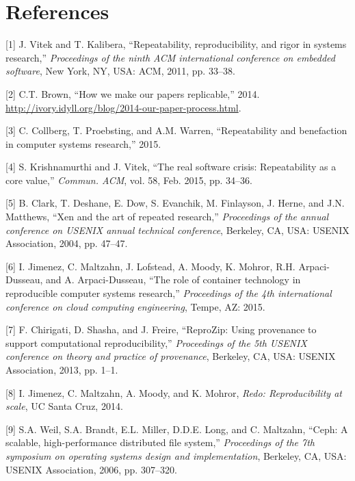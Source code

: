 \documentclass[10pt,reprint]{sigplanconf}
\begin{document}
\section{References}\label{references}

\noindent
\vspace{-2em} \setlength{\parindent}{-0.26in}
\setlength{\leftskip}{0.2in} \setlength{\parskip}{8pt}

{[}1{]} J. Vitek and T. Kalibera, ``Repeatability, reproducibility, and
rigor in systems research,'' \emph{Proceedings of the ninth ACM
international conference on embedded software}, New York, NY, USA: ACM,
2011, pp. 33--38.

{[}2{]} C.T. Brown, ``How we make our papers replicable,'' 2014.
\url{http://ivory.idyll.org/blog/2014-our-paper-process.html}.

{[}3{]} C. Collberg, T. Proebsting, and A.M. Warren, ``Repeatability and
benefaction in computer systems research,'' 2015.

{[}4{]} S. Krishnamurthi and J. Vitek, ``The real software crisis:
Repeatability as a core value,'' \emph{Commun. ACM}, vol. 58, Feb. 2015,
pp. 34--36.

{[}5{]} B. Clark, T. Deshane, E. Dow, S. Evanchik, M. Finlayson, J.
Herne, and J.N. Matthews, ``Xen and the art of repeated research,''
\emph{Proceedings of the annual conference on USENIX annual technical
conference}, Berkeley, CA, USA: USENIX Association, 2004, pp. 47--47.

{[}6{]} I. Jimenez, C. Maltzahn, J. Lofstead, A. Moody, K. Mohror, R.H.
Arpaci-Dusseau, and A. Arpaci-Dusseau, ``The role of container
technology in reproducible computer systems research,''
\emph{Proceedings of the 4th international conference on cloud computing
engineering}, Tempe, AZ: 2015.

{[}7{]} F. Chirigati, D. Shasha, and J. Freire, ``ReproZip: Using
provenance to support computational reproducibility,'' \emph{Proceedings
of the 5th USENIX conference on theory and practice of provenance},
Berkeley, CA, USA: USENIX Association, 2013, pp. 1--1.

{[}8{]} I. Jimenez, C. Maltzahn, A. Moody, and K. Mohror, \emph{Redo:
Reproducibility at scale}, UC Santa Cruz, 2014.

{[}9{]} S.A. Weil, S.A. Brandt, E.L. Miller, D.D.E. Long, and C.
Maltzahn, ``Ceph: A scalable, high-performance distributed file
system,'' \emph{Proceedings of the 7th symposium on operating systems
design and implementation}, Berkeley, CA, USA: USENIX Association, 2006,
pp. 307--320.
\end{document}

